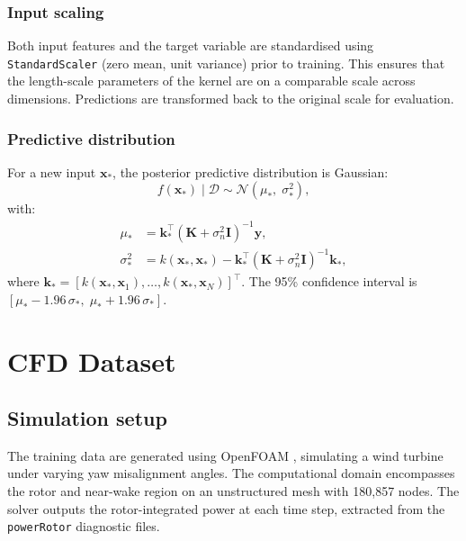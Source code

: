 \documentclass[12pt]{article}
\newcommand{\vect}[1]{\mathbf{#1}}
\newcommand{\mat}[1]{\mathbf{#1}}
\begin{document}
\subsubsection{Input scaling}

Both input features and the target variable are standardised using \texttt{StandardScaler} (zero mean, unit variance) prior to training.
This ensures that the length-scale parameters of the kernel are on a comparable scale across dimensions.
Predictions are transformed back to the original scale for evaluation.

\subsubsection{Predictive distribution}

For a new input $\vect{x}_*$, the posterior predictive distribution is Gaussian:
\begin{equation}
    f(\vect{x}_*) \mid \mathcal{D} \sim \mathcal{N}\!\left(\mu_*,\; \sigma_*^2\right),
\end{equation}
with:
\begin{align}
    \mu_* &= \vect{k}_*^\top (\mat{K} + \sigma_n^2 \mat{I})^{-1} \vect{y}, \\
    \sigma_*^2 &= k(\vect{x}_*, \vect{x}_*) - \vect{k}_*^\top (\mat{K} + \sigma_n^2 \mat{I})^{-1} \vect{k}_*,
\end{align}
where $\vect{k}_* = [k(\vect{x}_*, \vect{x}_1), \dots, k(\vect{x}_*, \vect{x}_N)]^\top$.
The 95\% confidence interval is $[\mu_* - 1.96\,\sigma_*,\; \mu_* + 1.96\,\sigma_*]$.


\section{CFD Dataset}
\label{sec:data}

\subsection{Simulation setup}

The training data are generated using OpenFOAM \citep{OpenFOAM}, simulating a wind turbine under varying yaw misalignment angles.
The computational domain encompasses the rotor and near-wake region on an unstructured mesh with 180{,}857 nodes.
The solver outputs the rotor-integrated power at each time step, extracted from the \texttt{powerRotor} diagnostic files.
\end{document}
